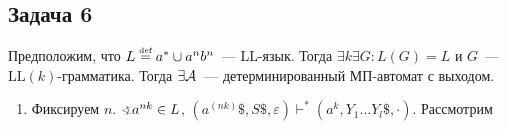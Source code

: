 \documentclass[a4paper]{article}
\def\A{{\cal A}}
\def\eqdef{\overset{\mbox{\tiny def}}{=}}
\def\LL{{\mathrm{LL}}}
\begin{document}
\subsection*{Задача 6}
Предположим, что $L\eqdef a^*\cup a^nb^n$~--- LL-язык. Тогда $\exists k\exists G\colon L(G)=L$ и $G$~--- $\LL(k)$-грамматика. Тогда $\exists \A$~--- детерминированный МП-автомат с выходом.
\begin{enumerate}
\item Фиксируем $n$. $\varangle a^{nk}\in L$, $(a^(nk)\$,S\$,\varepsilon)\vdash^*(a^k,Y_1...Y_l\$,\cdot)$. Рассмотрим
\end{enumerate}
\end{document}
